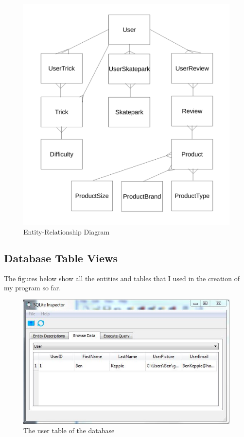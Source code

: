 \begin{figure}[H]
    \includegraphics[width=\textwidth]{./Design/EntityRelationships2.pdf}
    \caption{Entity-Relationship Diagram} \label{fig:Entity Diagram}
\end{figure}







\subsection{Database Table Views}

The figures below show all the entities and tables that I used in the creation of my program so far.

\begin{figure}[H]
    \includegraphics[width=\textwidth]{./Maintenance/Figures/UserTable.jpg}
    \caption{The user table of the database} \label{fig:User Table}
\end{figure}


